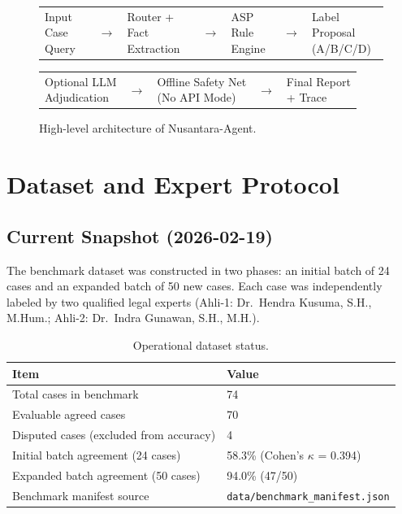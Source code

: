 \documentclass[11pt]{article}
\begin{document}
\begin{figure}[h]
\centering
\setlength{\tabcolsep}{5pt}
\renewcommand{\arraystretch}{1.2}
\begin{tabular}{m{2.6cm}c m{2.6cm}c m{2.6cm}c m{2.6cm}}
\fbox{\parbox[c][1.5cm][c]{2.4cm}{\centering Input\\Case Query}} &
$\rightarrow$ &
\fbox{\parbox[c][1.5cm][c]{2.4cm}{\centering Router +\\Fact Extraction}} &
$\rightarrow$ &
\fbox{\parbox[c][1.5cm][c]{2.4cm}{\centering ASP Rule\\Engine}} &
$\rightarrow$ &
\fbox{\parbox[c][1.5cm][c]{2.4cm}{\centering Label Proposal\\(A/B/C/D)}}
\end{tabular}

\vspace{0.4em}
\begin{tabular}{m{3.6cm}c m{3.6cm}c m{3.6cm}}
\fbox{\parbox[c][1.4cm][c]{3.3cm}{\centering Optional LLM\\Adjudication}} &
$\rightarrow$ &
\fbox{\parbox[c][1.4cm][c]{3.3cm}{\centering Offline Safety Net\\(No API Mode)}} &
$\rightarrow$ &
\fbox{\parbox[c][1.4cm][c]{3.3cm}{\centering Final Report\\+ Trace}}
\end{tabular}
\caption{High-level architecture of Nusantara-Agent.}
\label{fig:architecture}
\end{figure}

\section{Dataset and Expert Protocol}
\subsection{Current Snapshot (2026-02-19)}
The benchmark dataset was constructed in two phases: an initial batch of 24 cases and an expanded batch of 50 new cases.
Each case was independently labeled by two qualified legal experts (Ahli-1: Dr.~Hendra Kusuma, S.H., M.Hum.; Ahli-2: Dr.~Indra Gunawan, S.H., M.H.).

\begin{table}[h]
\centering
\begin{tabular}{ll}
\toprule
Item & Value \\
\midrule
Total cases in benchmark & 74 \\
Evaluable agreed cases & 70 \\
Disputed cases (excluded from accuracy) & 4 \\
Initial batch agreement (24 cases) & 58.3\% (Cohen's $\kappa$ = 0.394) \\
Expanded batch agreement (50 cases) & 94.0\% (47/50) \\
Benchmark manifest source & \texttt{data/benchmark\_manifest.json} \\
\bottomrule
\end{tabular}
\caption{Operational dataset status.}
\label{tab:status}
\end{table}
\end{document}
